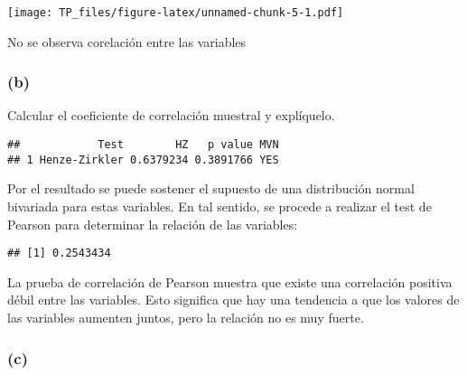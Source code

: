\documentclass[
]{article}
\newenvironment{Shaded}{\begin{snugshade}}{\end{snugshade}}
\newcommand{\AttributeTok}[1]{\textcolor[rgb]{0.77,0.63,0.00}{#1}}
\newcommand{\FunctionTok}[1]{\textcolor[rgb]{0.00,0.00,0.00}{#1}}
\newcommand{\NormalTok}[1]{#1}
\newcommand{\OtherTok}[1]{\textcolor[rgb]{0.56,0.35,0.01}{#1}}
\newcommand{\SpecialCharTok}[1]{\textcolor[rgb]{0.00,0.00,0.00}{#1}}
\newcommand{\StringTok}[1]{\textcolor[rgb]{0.31,0.60,0.02}{#1}}
\begin{document}
\texttt{[image: TP\_files/figure-latex/unnamed-chunk-5-1.pdf]}

No se observa corelación entre las variables

\hypertarget{b}{%
\subsubsection{(b)}\label{b}}

Calcular el coeficiente de correlación muestral y explíquelo.

\begin{Shaded}
\end{Shaded}

\begin{verbatim}
##            Test        HZ   p value MVN
## 1 Henze-Zirkler 0.6379234 0.3891766 YES
\end{verbatim}

Por el resultado se puede sostener el supuesto de una distribución
normal bivariada para estas variables. En tal sentido, se procede a
realizar el test de Pearson para determinar la relación de las
variables:

\begin{Shaded}
\end{Shaded}

\begin{verbatim}
## [1] 0.2543434
\end{verbatim}

La prueba de correlación de Pearson muestra que existe una correlación
positiva débil entre las variables. Esto significa que hay una tendencia
a que los valores de las variables aumenten juntos, pero la relación no
es muy fuerte.

\hypertarget{c}{%
\subsubsection{(c)}\label{c}}
\end{document}
